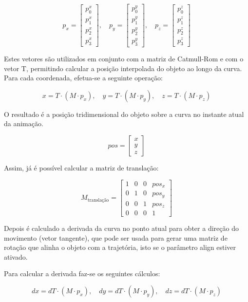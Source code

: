 \documentclass[12pt, a4paper]{article}
\begin{document}
$$
{p}_x = \begin{bmatrix} p_0^x \\ p_1^x \\ p_2^x \\ p_3^x \end{bmatrix}, \quad
{p}_y = \begin{bmatrix} p_0^y \\ p_1^y \\ p_2^y \\ p_3^y \end{bmatrix}, \quad
{p}_z = \begin{bmatrix} p_0^z \\ p_1^z \\ p_2^z \\ p_3^z \end{bmatrix}
$$

Estes vetores são utilizados em conjunto com a matriz de Catmull-Rom e com o vetor T,
permitindo calcular a posição interpolada do objeto ao longo da curva. Para cada coordenada,
efetua-se a seguinte operação:

$$
x = {T} \cdot ({M} \cdot {p}_x), \quad
y = {T} \cdot ({M} \cdot {p}_y), \quad
z = {T} \cdot ({M} \cdot {p}_z)
$$

O resultado é a posição tridimensional do objeto sobre a curva no instante atual da animação.

$$
{pos} = \begin{bmatrix} x \\ y \\ z \end{bmatrix}
$$

Assim, já é possível calcular a matriz de translação:

$$
M_{\text{translação}} =
\begin{bmatrix}
    1 & 0   & 0  & pos_x \\
    0  & 1 & 0 & pos_y \\
    0 & 0  & 1  & pos_z \\
    0  & 0 & 0    & 1
\end{bmatrix}
$$

Depois é calculado a derivada da curva no ponto atual para obter a direção do movimento
(vetor tangente), que pode ser usada para gerar uma matriz de rotação que alinha o objeto
com a trajetória, isto se o parâmetro align estiver ativado.

Para calcular a derivada faz-se os seguintes cálculos:

$$
dx = {dT} \cdot ({M} \cdot {p}_x), \quad
dy = {dT} \cdot ({M} \cdot {p}_y), \quad
dz = {dT} \cdot ({M} \cdot {p}_z)
$$
\end{document}
